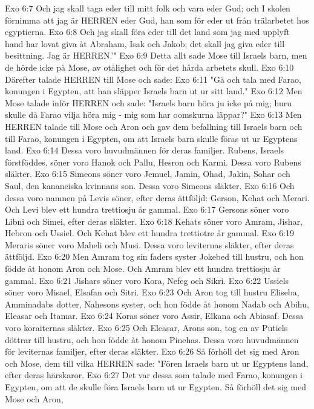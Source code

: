 Exo 6:7  Och jag skall taga eder till mitt folk och vara eder Gud; och I skolen förnimma att jag är HERREN eder Gud, han som för eder ut från trälarbetet hos egyptierna.
Exo 6:8  Och jag skall föra eder till det land som jag med upplyft hand har lovat giva åt Abraham, Isak och Jakob; det skall jag giva eder till besittning. Jag är HERREN.'"
Exo 6:9  Detta allt sade Mose till Israels barn, men de hörde icke på Mose, av otålighet och för det hårda arbetets skull.
Exo 6:10  Därefter talade HERREN till Mose och sade:
Exo 6:11  "Gå och tala med Farao, konungen i Egypten, att han släpper Israels barn ut ur sitt land."
Exo 6:12  Men Mose talade inför HERREN och sade: "Israels barn höra ju icke på mig; huru skulle då Farao vilja höra mig - mig som har oomskurna läppar?"
Exo 6:13  Men HERREN talade till Mose och Aron och gav dem befallning till Israels barn och till Farao, konungen i Egypten, om att Israels barn skulle föras ut ur Egyptens land.
Exo 6:14  Dessa voro huvudmännen för deras familjer. Rubens, Israels förstföddes, söner voro Hanok och Pallu, Hesron och Karmi. Dessa voro Rubens släkter.
Exo 6:15  Simeons söner voro Jemuel, Jamin, Ohad, Jakin, Sohar och Saul, den kananeiska kvinnans son. Dessa voro Simeons släkter.
Exo 6:16  Och dessa voro namnen på Levis söner, efter deras ättföljd: Gerson, Kehat och Merari. Och Levi blev ett hundra trettiosju år gammal.
Exo 6:17  Gersons söner voro Libni och Simei, efter deras släkter.
Exo 6:18  Kehats söner voro Amram, Jishar, Hebron och Ussiel. Och Kehat blev ett hundra trettiotre år gammal.
Exo 6:19  Meraris söner voro Maheli och Musi. Dessa voro leviternas släkter, efter deras ättföljd.
Exo 6:20  Men Amram tog sin faders syster Jokebed till hustru, och hon födde åt honom Aron och Mose. Och Amram blev ett hundra trettiosju år gammal.
Exo 6:21  Jishars söner voro Kora, Nefeg och Sikri.
Exo 6:22  Ussiels söner voro Misael, Elsafan och Sitri.
Exo 6:23  Och Aron tog till hustru Eliseba, Amminadabs dotter, Nahesons syster, och hon födde åt honom Nadab och Abihu, Eleasar och Itamar.
Exo 6:24  Koras söner voro Assir, Elkana och Abiasaf. Dessa voro koraiternas släkter.
Exo 6:25  Och Eleasar, Arons son, tog en av Putiels döttrar till hustru, och hon födde åt honom Pinehas. Dessa voro huvudmännen för leviternas familjer, efter deras släkter.
Exo 6:26  Så förhöll det sig med Aron och Mose, dem till vilka HERREN sade: "Fören Israels barn ut ur Egyptens land, efter deras härskaror.
Exo 6:27  Det var dessa som talade med Farao, konungen i Egypten, om att de skulle föra Israels barn ut ur Egypten. Så förhöll det sig med Mose och Aron,
